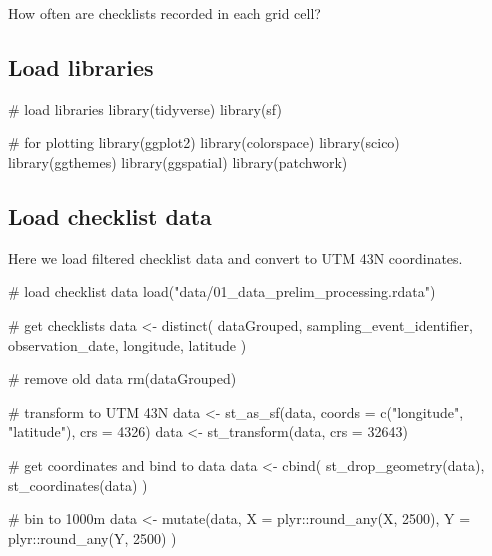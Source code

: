 \documentclass[
]{article}
\newenvironment{Shaded}{}{}
\newcommand{\CommentTok}[1]{\textcolor[rgb]{0.00,0.50,0.00}{#1}}
\newcommand{\DataTypeTok}[1]{#1}
\newcommand{\DecValTok}[1]{#1}
\newcommand{\KeywordTok}[1]{\textcolor[rgb]{0.00,0.00,1.00}{#1}}
\newcommand{\NormalTok}[1]{#1}
\newcommand{\OperatorTok}[1]{#1}
\newcommand{\StringTok}[1]{\textcolor[rgb]{0.00,0.50,0.50}{#1}}
\begin{document}
How often are checklists recorded in each grid cell?

\hypertarget{load-libraries}{%
\subsection{Load libraries}\label{load-libraries}}

\begin{Shaded}
\begin{Highlighting}[]
\CommentTok{# load libraries}
\KeywordTok{library}\NormalTok{(tidyverse)}
\KeywordTok{library}\NormalTok{(sf)}

\CommentTok{# for plotting}
\KeywordTok{library}\NormalTok{(ggplot2)}
\KeywordTok{library}\NormalTok{(colorspace)}
\KeywordTok{library}\NormalTok{(scico)}
\KeywordTok{library}\NormalTok{(ggthemes)}
\KeywordTok{library}\NormalTok{(ggspatial)}
\KeywordTok{library}\NormalTok{(patchwork)}
\end{Highlighting}
\end{Shaded}

\hypertarget{load-checklist-data}{%
\subsection{Load checklist data}\label{load-checklist-data}}

Here we load filtered checklist data and convert to UTM 43N coordinates.

\begin{Shaded}
\begin{Highlighting}[]
\CommentTok{# load checklist data}
\KeywordTok{load}\NormalTok{(}\StringTok{"data/01_data_prelim_processing.rdata"}\NormalTok{)}

\CommentTok{# get checklists}
\NormalTok{data <-}\StringTok{ }\KeywordTok{distinct}\NormalTok{(}
\NormalTok{  dataGrouped, sampling_event_identifier, observation_date,}
\NormalTok{  longitude, latitude}
\NormalTok{)}

\CommentTok{# remove old data}
\KeywordTok{rm}\NormalTok{(dataGrouped)}

\CommentTok{# transform to UTM 43N}
\NormalTok{data <-}\StringTok{ }\KeywordTok{st_as_sf}\NormalTok{(data, }\DataTypeTok{coords =} \KeywordTok{c}\NormalTok{(}\StringTok{"longitude"}\NormalTok{, }\StringTok{"latitude"}\NormalTok{), }\DataTypeTok{crs =} \DecValTok{4326}\NormalTok{)}
\NormalTok{data <-}\StringTok{ }\KeywordTok{st_transform}\NormalTok{(data, }\DataTypeTok{crs =} \DecValTok{32643}\NormalTok{)}

\CommentTok{# get coordinates and bind to data}
\NormalTok{data <-}\StringTok{ }\KeywordTok{cbind}\NormalTok{(}
  \KeywordTok{st_drop_geometry}\NormalTok{(data),}
  \KeywordTok{st_coordinates}\NormalTok{(data)}
\NormalTok{)}

\CommentTok{# bin to 1000m}
\NormalTok{data <-}\StringTok{ }\KeywordTok{mutate}\NormalTok{(data,}
  \DataTypeTok{X =}\NormalTok{ plyr}\OperatorTok{::}\KeywordTok{round_any}\NormalTok{(X, }\DecValTok{2500}\NormalTok{),}
  \DataTypeTok{Y =}\NormalTok{ plyr}\OperatorTok{::}\KeywordTok{round_any}\NormalTok{(Y, }\DecValTok{2500}\NormalTok{)}
\NormalTok{)}
\end{Highlighting}
\end{Shaded}
\end{document}
